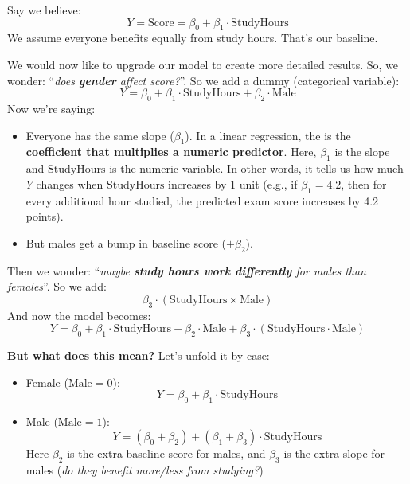 \begin{examplebox}
    Say we believe:
    \begin{equation*}
        Y = \text{Score} = \beta_0 + \beta_1 \cdot \text{StudyHours}
    \end{equation*}
    We assume everyone benefits equally from study hours. That's our baseline.

    \highspace
    We would now like to upgrade our model to create more detailed results. So, we wonder: ``\emph{does \textbf{gender} affect score?}''. So we add a dummy (categorical variable):
    \begin{equation*}
        Y = \beta_0 + \beta_1 \cdot \text{StudyHours} + \beta_2 \cdot \text{Male}
    \end{equation*}
    Now we're saying:
    \begin{itemize}
        \item Everyone has the same slope ($\beta_1$). In a linear regression, the  is the \textbf{coefficient that multiplies a numeric predictor}. Here, $\beta_1$ is the slope and $\text{StudyHours}$ is the numeric variable. In other words, it tells us how much $Y$ changes when $\text{StudyHours}$ increases by 1 unit (e.g., if $\beta_1 = 4.2$, then for every additional hour studied, the predicted exam score increases by 4.2 points).
        \item But males get a bump in baseline score ($+ \beta_2$).
    \end{itemize}

    \highspace
    Then we wonder: ``\emph{maybe \textbf{study hours work differently} for males than females}''. So we add:
    \begin{equation*}
        \beta_3 \cdot \left(\text{StudyHours} \times \text{Male}\right)
    \end{equation*}
    And now the model becomes:
    \begin{equation*}
        Y = \beta_0 + \beta_1 \cdot \text{StudyHours} + \beta_2 \cdot \text{Male} + \beta_3 \cdot \left(\text{StudyHours} \cdot \text{Male}\right)
    \end{equation*}

    \highspace
    \textcolor{Green3}{ \textbf{But what does this mean?}} Let's unfold it by case:
    \begin{itemize}
        \item Female ($\text{Male} = 0$):
        \begin{equation*}
            Y = \beta_0 + \beta_1 \cdot \text{StudyHours}
        \end{equation*}
        \item Male ($\text{Male} = 1$):
        \begin{equation*}
            Y = \left(\beta_0 + \beta_2\right) + \left(\beta_1 + \beta_3\right) \cdot \text{StudyHours}
        \end{equation*}
        Here $\beta_2$ is the extra baseline score for males, and $\beta_3$ is the extra slope for males (\emph{do they benefit more/less from studying?})
    \end{itemize}
\end{examplebox}


